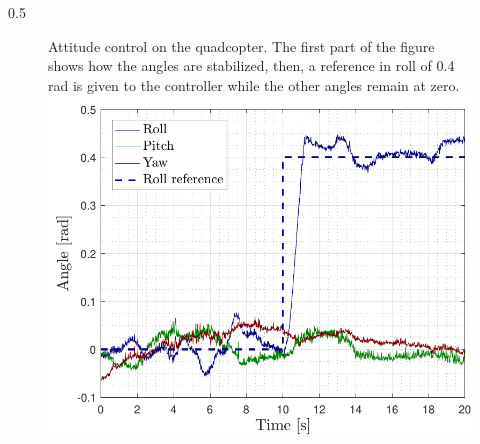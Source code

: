 \vspace{-2cm}
\begin{columns}[t,totalwidth=\twocolwid] %
		
		\begin{column}{0.5\twocolwid}%
        \vspace{3cm}
  		\centering
			\begin{figure}
                 \captionbox
                 {Attitude control on the quadcopter. The first part of the figure shows how the angles are stabilized, then, a reference in roll of 0.4 rad is given to the controller while the other angles remain at zero.}
				{
                    \includegraphics[width=.93\linewidth]{figures/AttitudeControl}
				}
			\end{figure}
		\end{column} %
		

\end{columns}
